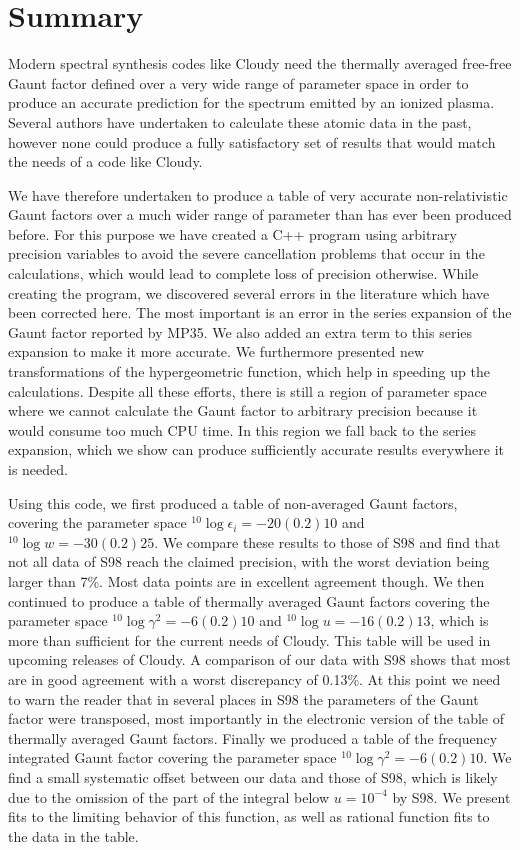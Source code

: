 \documentclass[useAMS,usenatbib]{mn2e}
\begin{document}
\section{Summary}
\label{summary}

Modern spectral synthesis codes like Cloudy need the thermally averaged
free-free Gaunt factor defined over a very wide range of parameter space in
order to produce an accurate prediction for the spectrum emitted by an ionized
plasma. Several authors have undertaken to calculate these atomic data in the
past, however none could produce a fully satisfactory set of results that
would match the needs of a code like Cloudy.

We have therefore undertaken to produce a table of very accurate
non-relativistic Gaunt factors over a much wider range of parameter than has
ever been produced before. For this purpose we have created a C++ program
using arbitrary precision variables to avoid the severe cancellation problems
that occur in the calculations, which would lead to complete loss of precision
otherwise. While creating the program, we discovered several errors in the
literature which have been corrected here. The most important is an error in
the series expansion of the Gaunt factor reported by MP35. We also added an
extra term to this series expansion to make it more accurate. We furthermore
presented new transformations of the hypergeometric function, which help in
speeding up the calculations. Despite all these efforts, there is still a
region of parameter space where we cannot calculate the Gaunt factor to
arbitrary precision because it would consume too much CPU time. In this region
we fall back to the series expansion, which we show can produce sufficiently
accurate results everywhere it is needed.

Using this code, we first produced a table of non-averaged Gaunt factors,
covering the parameter space ${}^{10}\log\epsilon_i = -20 (0.2) 10$ and
${}^{10}\log w = -30 (0.2) 25$. We compare these results to those of S98 and
find that not all data of S98 reach the claimed precision, with the worst
deviation being larger than 7\%. Most data points are in excellent agreement
though. We then continued to produce a table of thermally averaged Gaunt
factors covering the parameter space ${}^{10}\log\gamma^2 = -6(0.2)10$ and
${}^{10}\log u = -16(0.2)13$, which is more than sufficient for the current
needs of Cloudy. This table will be used in upcoming releases of Cloudy. A
comparison of our data with S98 shows that most are in good agreement with a
worst discrepancy of 0.13\%. At this point we need to warn the reader that in
several places in S98 the parameters of the Gaunt factor were transposed, most
importantly in the electronic version of the table of thermally averaged Gaunt
factors. Finally we produced a table of the frequency integrated Gaunt factor
covering the parameter space ${}^{10}\log\gamma^2 = -6(0.2)10$. We find a
small systematic offset between our data and those of S98, which is likely due
to the omission of the part of the integral below $u = 10^{-4}$ by S98. We
present fits to the limiting behavior of this function, as well as rational
function fits to the data in the table.
\end{document}

